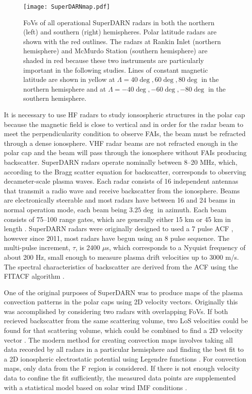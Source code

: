 \begin{figure}
	\texttt{[image: SuperDARNmap.pdf]}
	\caption{FoVs of all operational SuperDARN radars in both the northern (left) and southern (right) hemispheres.  Polar latitude radars are shown with the red outlines.  The radars at Rankin Inlet (northern hemisphere) and McMurdo Station (southern hemisphere) are shaded in red because these two instruments are particularly important in the following studies.  Lines of constant magnetic latitude are shown in yellow at \(\Lambda = 40\deg, 60\deg, 80\deg\) in the northern hemisphere and at \(\Lambda = -40\deg,-60\deg,-80\deg\) in the southern hemisphere.}
	\label{fig:superdarnmap}
\end{figure}

It is necessary to use HF radars to study ionsospheric structures in the polar cap because the magnetic field is close to vertical and in order for the radar beam to meet the perpendicularity condition to observe FAIs, the beam must be refracted through a dense ionosphere.  VHF radar beams are not refracted enough in the polar cap and the beam will pass through the ionosphere without FAIs producing backscatter.  SuperDARN radars operate nominally between 8--20 MHz, which, according to the Bragg scatter equation for backscatter, corresponds to observing decameter-scale plasma waves.  Each radar consists of 16 independent antennas that transmit a radio wave and receive backscatter from the ionosphere.  Beams are electronically steerable and most radars have between 16 and 24 beams in normal operation mode, each beam being \(3.25\deg\) in azimuth.  Each beam consists of 75--100 range gates, which are generally either 15 km or 45 km in length \citep{Chisham2007}.  SuperDARN radars were originally designed to used a 7 pulse ACF \citep{Farley1972,Greenwald1983,Greenwald1985}, however since 2011, most radars have begun using an 8 pulse sequence.   The multi-pulse increment, \(\tau\), is 2400 \(\mu\)s, which corresponds to a Nyquist frequency of about 200 Hz, small enough to measure plasma drift velocities up to 3000 m/s.  The spectral characteristics of backscatter are derived from the ACF using the FITACF algorithm \citep{Ponomarenko2006}.

One of the original purposes of SuperDARN was to produce maps of the plasma convection patterns in the polar caps using 2D velocity vectors.  Originally this was accomplished by considering two radars with overlapping FoVs.  If both recieved backscatter from the same scattering volume, two LoS velocities could be found for that scattering volume, which could be combined to find a 2D velocity vector \citep{Ruohoniemi1989}.  The modern method for creating convection maps involves taking all data recorded by all radars in a particular hemisphere and finding the best fit to a 2D ionospheric electrostatic potential using Legendre functions \citep{Ruohoniemi1998}.  For convection maps, only data from the F region is considered.  If there is not enough velocity data to confine the fit sufficiently, the measured data points are supplemented with a statistical model based on solar wind IMF conditions \citep{Ruohoniemi1995,Ruohonieme2005}.

